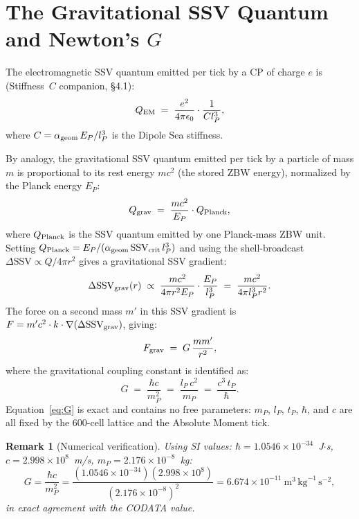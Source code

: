 \documentclass[12pt]{article}
\newtheorem{remark}[theorem]{Remark}
\newcommand{\lP}{l_P}
\newcommand{\tP}{t_P}
\newcommand{\EP}{E_P}
\newcommand{\mP}{m_P}
\newcommand{\SSV}{\text{SSV}}
\newcommand{\alphageom}{\alpha_{\rm geom}}
\begin{document}
\section{The Gravitational SSV Quantum and Newton's \boldmath$G$}
\label{sec:G}

The electromagnetic SSV quantum emitted per tick by a CP of charge $e$ is
(Stiffness~$C$ companion, \S4.1):
\begin{equation}
  Q_{\rm EM} \;=\; \frac{e^2}{4\pi\epsilon_0}\cdot\frac{1}{C\lP^3},
  \label{eq:Q_EM}
\end{equation}
where $C = \alphageom\,\EP/\lP^3$ is the Dipole Sea stiffness.

By analogy, the gravitational SSV quantum emitted per tick by a particle
of mass $m$ is proportional to its rest energy $mc^2$ (the stored ZBW
energy), normalized by the Planck energy $\EP$:
\begin{equation}
  Q_{\rm grav} \;=\; \frac{mc^2}{\EP}\cdot Q_{\rm Planck},
  \label{eq:Q_grav}
\end{equation}
where $Q_{\rm Planck}$ is the SSV quantum emitted by one Planck-mass ZBW
unit.  Setting $Q_{\rm Planck} = \EP/(\alphageom\,\SSV_{\rm crit}\,\lP^3)$
and using the shell-broadcast $\Delta\SSV \propto Q/4\pi r^2$ gives a
gravitational SSV gradient:
\begin{equation}
  \Delta\SSV_{\rm grav}(r) \;\propto\; \frac{mc^2}{4\pi r^2\EP}\cdot\frac{\EP}{\lP^3}
  \;=\; \frac{mc^2}{4\pi\lP^3 r^2}.
  \label{eq:DSSV_grav}
\end{equation}
The force on a second mass $m'$ in this SSV gradient is $F = m'c^2 \cdot k
\cdot \nabla(\Delta\SSV_{\rm grav})$, giving:
\begin{equation}
  F_{\rm grav} \;=\; G\,\frac{mm'}{r^2},
  \label{eq:Newton}
\end{equation}
where the gravitational coupling constant is identified as:
\begin{equation}
  \boxed{G \;=\; \frac{\hbar c}{\mP^2}
  \;=\; \frac{\lP\,c^2}{\mP}
  \;=\; \frac{c^3\,\tP}{\hbar}.}
  \label{eq:G}
\end{equation}
Equation~\eqref{eq:G} is exact and contains no free parameters: $\mP$,
$\lP$, $\tP$, $\hbar$, and $c$ are all fixed by the 600-cell lattice and
the Absolute Moment tick.

\begin{remark}[Numerical verification]
Using SI values: $\hbar = 1.0546\times10^{-34}$~J$\cdot$s,
$c = 2.998\times10^8$~m/s, $\mP = 2.176\times10^{-8}$~kg:
\[
  G = \frac{\hbar c}{\mP^2}
  = \frac{(1.0546\times10^{-34})(2.998\times10^8)}{(2.176\times10^{-8})^2}
  = 6.674\times10^{-11}\ \text{m}^3\,\text{kg}^{-1}\,\text{s}^{-2},
\]
in exact agreement with the CODATA value.
\end{remark}
\end{document}
